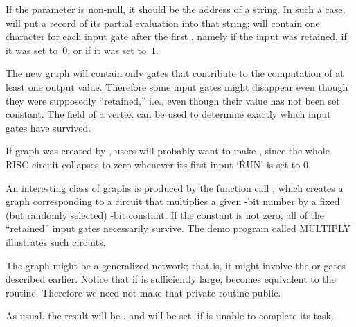 If the  parameter is non-null, it should be the address of a
string.
In such a case,  will put a record of its partial
evaluation
into that string;  will contain one character for each input gate
after the first , namely  if the input was
retained,  if it was set to~$0$, or  if it was set
to~$1$.

The new graph will contain only gates that contribute to the computation
of at least one output value. Therefore some input gates might disappear
even though they were supposedly ``retained,'' i.e., even though their
value has not been set constant. The  field of a vertex can be
used to determine exactly which input gates have survived.

If graph  was created by , users will probably want to
make
, since the whole RISC circuit collapses to zero whenever its
first input `\.{RUN}' is set to 0.

An interesting class of graphs is produced by
the function call , which
creates a graph corresponding to a circuit that multiplies a given -bit
number by a fixed (but randomly selected) -bit constant. If the
constant
is not zero, all  of the ``retained'' input gates necessarily survive.
The demo program called {\sc MULTIPLY} illustrates such circuits.

The graph  might be a generalized network; that is, it might
involve the  or  gates described earlier. Notice that
if  is
sufficiently large,  becomes equivalent to the 
routine. Therefore we need not make that private routine public.

As usual, the result will be \PB{$\NULL$}, and  will be
set,
if  is unable to complete its task.

